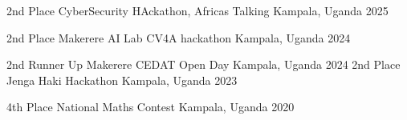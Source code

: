 \begin{cvhonors}

  \cvhonor
    {2nd Place} %
    {CyberSecurity HAckathon, Africas Talking} %
    {Kampala, Uganda} %
    {2025} %

  \cvhonor
    {2nd Place} %
    {Makerere AI Lab CV4A hackathon} %
    {Kampala, Uganda} %
    {2024} %

  \cvhonor
    {2nd Runner Up} %
    {Makerere CEDAT Open Day} %
    {Kampala, Uganda} %
    {2024} %
  \cvhonor
    {2nd Place} %
    {Jenga Haki Hackathon} %
    {Kampala, Uganda} %
    {2023} %

  \cvhonor
    {4th Place} %
    {National Maths Contest} %
    {Kampala, Uganda} %
    {2020} %

\end{cvhonors}






